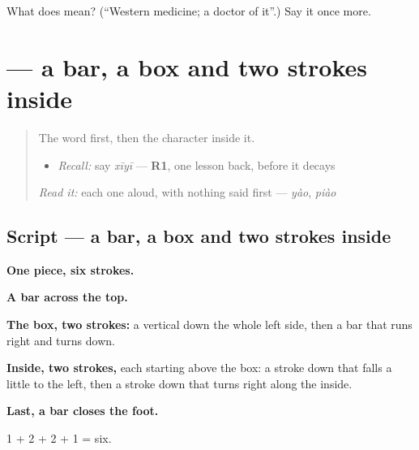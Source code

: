 \begin{tcolorbox}[breakable,colback=teal!4,colframe=teal!35!black,title={Before you move on}]
What does  mean? (\textquotedblleft{}Western medicine; a doctor of it\textquotedblright{}.) Say it once more.
\end{tcolorbox}
\section[\texorpdfstring{\zh{西} (xī)}{西 (xī)}]{ — a bar, a box and two strokes inside}

\label{lesson:ZH-W231-xi-west}



\begin{quote}
The word first, then the character inside it.

\begin{itemize}
\raggedright
  \item \emph{Recall:} say \emph{xīyī} — \textbf{R1}, one lesson back, before it decays
\end{itemize}

\begin{quote}
 
\end{quote}

\emph{Read it:} each one aloud, with nothing said first — \emph{yào}, \emph{piào}
\end{quote}

\subsection*{Script — a bar, a box and two strokes inside}

\begin{quote}
\end{quote}

\textbf{One piece, six strokes.}

\textbf{A bar across the top.}

\textbf{The box, two strokes:} a vertical down the whole left side, then a bar that runs right and turns down.

\textbf{Inside, two strokes,} each starting above the box: a stroke down that falls a little to the left, then a stroke down that turns right along the inside.

\textbf{Last, a bar closes the foot.}

1 + 2 + 2 + 1 = six.


